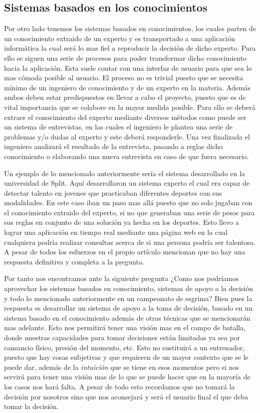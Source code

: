 \subsection{Sistemas basados en los conocimientos}

Por otro lado tenemos los sistemas basados en conocimientos, los cuales parten de un conocimiento extraido de un
experto y es transportado a una aplicación informática la cual será lo mas fiel a reproducir
la decisión de dicho experto. Para ello se siguen una serie de procesos para poder transformar
dicho conocimiento hacia la aplicación. Esta suele contar con una interfaz de usuario para que
sea lo mas cómoda posible al usuario. El proceso no es trivial puesto que se necesita mínimo
de un ingeniero de conocimiento y de un experto en la materia. Además ambos deben estar predispuestos
en llevar a cabo el proyecto, puesto que es de vital importancia que se colabore en la mayor
medida posible. Para ello se deberá extraer el conocimiento del experto mediante diversos métodos
como puede ser un sistema de entrevistas, en las cuales el ingeniero le plantea una serie
de problemas y/o dudas al experto y este deberá responderle. Una vez finalizada el ingeniero
analizará el resultado de la entrevista, pasando a reglas dicho conocimiento o elaborando
una nueva entrevista en caso de que fuera necesario.

Un ejemplo de lo mencionado anteriormente sería el sistema desarrollado en la universidad de Split.
Aquí desarrollaron un sistema experto el cual era capaz de detectar talento en jovenes que
practicaban diferentes deportes con sus modalidades. En este caso iban un paso mas allá puesto
que no solo jugaban con el conocimiento extraido del experto, si no que generaban una serie de
pesos para sus reglas en conjunto de una solución ya hecha en los deportes. Esto llevo a lograr
una aplicación en tiempo real mediante una página web en la cual cualquiera podría realizar consultas
acerca de si una persona podría ser talentosa. A pesar de todos los esfuerzos en el propio artículo
mencionan que no hay una respuesta definitiva y completa a la pregunta.

Por tanto nos encontramos ante la siguiente pregunta ¿Como nos podríamos aprovechar los
sistemas basados en conocimiento, sistemas de apoyo a la decisión y todo lo mencionado
anteriormente en un campeonato de esgrima? Bien pues la respuesta es desarrollar un sistema de apoyo
a la toma de decisión, basado en un sistema basado en el conocimiento además de otras técnicas que
se mencionarán mas adelante. Esto nos permitirá tener una visión mas en el campo de batalla, donde
nuestras capacidades para tomar decisiones están limitadas ya sea por cansancio físico, presión del
momento, etc. Esto no sustituirá a un entrenador, puesto que hay cosas subjetivas y que requieren
de un mayor contexto que se le puede dar, además de la \textit{intuición} que se tiene en esos momentos
pero si nos servirá para tener una visión mas de lo que se puede hacer que en la mayoría de los
casos nos hará falta. A pesar de todo esto recordamos que no tomará la decisión por nosotros
sino que nos aconsejará y será el usuario final el que deba tomar la decisión.

